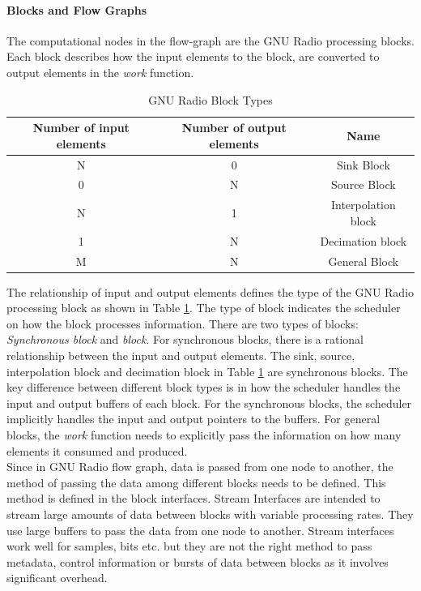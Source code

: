\paragraph{Blocks and Flow Graphs}

The computational nodes in the flow-graph are the GNU Radio processing blocks.
Each block describes how the input elements to the block, are converted to output elements in the \textit{work} function.

\begin{table}[h!]
\centering
\begin{tabular}{|c|c|c|}
\hline
Number of input elements & Number of output elements & Name\\
\hline
N & 0 & Sink Block\\
0 & N & Source Block\\
N & 1 & Interpolation block\\
1 & N & Decimation block\\
M & N & General Block\\
\hline
\end{tabular}
\caption{GNU Radio Block Types}
\label{block_type}
\end{table} 

The relationship of input and output elements defines the type of the GNU Radio processing block as shown in Table \ref{block_type}.
The type of block indicates the scheduler on how the block processes information.
There are two types of blocks: \textit{Synchronous block} and \textit{block}.
For synchronous blocks, there is a rational relationship between the input and output elements.
The sink, source, interpolation block and decimation block in Table \ref{block_type} are synchronous blocks.
The key difference between different block types is in how the scheduler handles the input and output buffers of each block.
For the synchronous blocks, the scheduler implicitly handles the input and output pointers to the buffers.
For general blocks, the \textit{work} function needs to explicitly pass the information on how many elements it consumed and produced.\\

Since in GNU Radio flow graph, data is passed from one node to another, the method of passing the data among different blocks needs to be defined.
This method is defined in the block interfaces.
Stream Interfaces are intended to stream large amounts of data between blocks with variable processing rates.
They use large buffers to pass the data from one node to another.
Stream interfaces work well for samples, bits etc. but they are not the right method to pass metadata, control information or bursts of data between blocks as it involves significant overhead.\\

